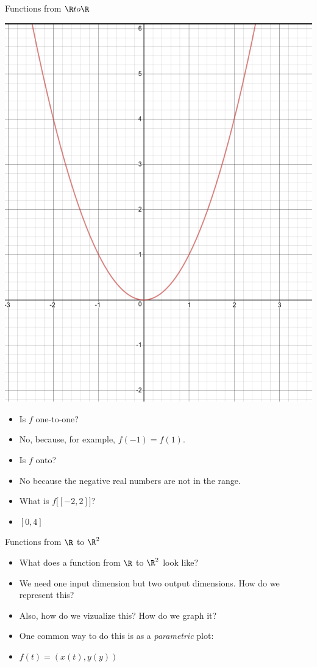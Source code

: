 \documentclass{beamer}
\begin{document}
\begin{frame}{Functions from $\R to \R$}

\includegraphics[scale=0.1]{parabola}

\begin{itemize}
\item Is $f$ one-to-one?
\item No, because, for example, $f(-1) = f(1)$.
\item Is $f$ onto?
\item No because the negative real numbers are not in the range.
\item What is $f\big[ [-2,2] \big]$?
\item $[0, 4]$
\end{itemize}

\end{frame}

\begin{frame}{Functions from $\R$ to $\R^2$}

\begin{itemize}
\item What does a function from $\R$ to $\R^2$ look like?
\item We need one input dimension but two output dimensions.
How do we represent this?
\item Also, how do we vizualize this? How do we graph it?
\item One common way to do this is as a \emph{parametric} plot:
\item $f(t) = (x(t), y(y))$
\end{itemize}

\end{frame}
\end{document}
